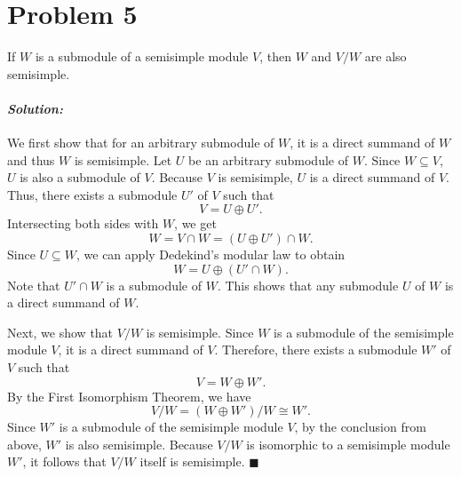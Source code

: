 \documentclass[12pt, a4paper]{article}
\theoremstyle{remark}
\newenvironment{solution}
  {\paragraph{\textit{Solution:}}\par\medskip}
  {\hfill$\blacksquare$\vspace{0.1cm}}
\begin{document}
\section*{Problem 5}
If $W$ is a submodule of a semisimple module $V$, then $W$ and $V/W$ are also semisimple.
\begin{solution}
    We first show that for an arbitrary submodule of $W$, it is a direct summand of $W$ and thus $W$ is semisimple.
    Let $U$ be an arbitrary submodule of $W$. 
    Since $W \subseteq V$, $U$ is also a submodule of $V$. 
    Because $V$ is semisimple, $U$ is a direct summand of $V$. 
    Thus, there exists a submodule $U'$ of $V$ such that
$$V = U \oplus U'.$$
Intersecting both sides with $W$, we get
$$W = V \cap W = (U \oplus U') \cap W.$$
Since $U \subseteq W$, we can apply Dedekind's modular law to obtain
$$W = U \oplus (U' \cap W).$$
Note that $U' \cap W$ is a submodule of $W$. This shows that any submodule $U$ of $W$ is a direct summand of $W$.

Next, we show that $V/W$ is semisimple.
Since $W$ is a submodule of the semisimple module $V$, it is a direct summand of $V$. Therefore, there exists a submodule $W'$ of $V$ such that
$$V = W \oplus W'.$$
By the First Isomorphism Theorem, we have
$$V/W = (W \oplus W')/W \cong W'.$$
Since $W'$ is a submodule of the semisimple module $V$, by the conclusion from above, $W'$ is also semisimple. Because $V/W$ is isomorphic to a semisimple module $W'$, it follows that $V/W$ itself is semisimple. 
\end{solution}
\end{document}
